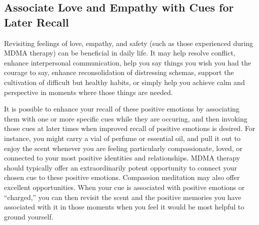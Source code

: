 \documentclass[12pt,letterpaper]{article}
\begin{document}
\subsection{Associate Love and Empathy with Cues for Later Recall}
Revisiting feelings of love, empathy, and safety (such as those experienced during MDMA therapy) can be beneficial in daily life. It may help resolve conflict, enhance interpersonal communication, help you say things you wish you had the courage to say, enhance reconsolidation of distressing schemas, support the cultivation of difficult but healthy habits, or simply help you achieve calm and perspective in moments where those things are needed.

It is possible to enhance your recall of these positive emotions by associating them with one or more specific cues while they are occuring, and then invoking those cues at later times when improved recall of positive emotions is desired. For instance, you might carry a vial of perfume or essential oil, and pull it out to enjoy the scent whenever you are feeling particularly compassionate, loved, or connected to your most positive identities and relationships. MDMA therapy should typically offer an extraordinarily potent opportunity to connect your chosen cue to these positive emotions. Compassion meditation may also offer excellent opportunities. When your cue is associated with positive emotions or “charged,” you can then revisit the scent and the positive memories you have associated with it in those moments when you feel it would be most helpful to ground yourself.
\end{document}
